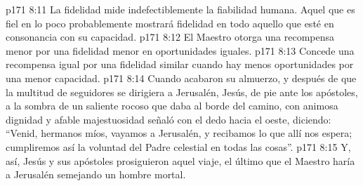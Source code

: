 \vs p171 8:11 La fidelidad mide indefectiblemente la fiabilidad humana. Aquel que es fiel en lo poco probablemente mostrará fidelidad en todo aquello que esté en consonancia con su capacidad.
\vs p171 8:12 El Maestro otorga una recompensa menor por una fidelidad menor en oportunidades iguales.
\vs p171 8:13 Concede una recompensa igual por una fidelidad similar cuando hay menos oportunidades por una menor capacidad.
\vs p171 8:14 \pc Cuando acabaron su almuerzo, y después de que la multitud de seguidores se dirigiera a Jerusalén, Jesús, de pie ante los apóstoles, a la sombra de un saliente rocoso que daba al borde del camino, con animosa dignidad y afable majestuosidad señaló con el dedo hacia el oeste, diciendo: “Venid, hermanos míos, vayamos a Jerusalén, y recibamos lo que allí nos espera; cumpliremos así la voluntad del Padre celestial en todas las cosas”.
\vs p171 8:15 Y, así, Jesús y sus apóstoles prosiguieron aquel viaje, el último que el Maestro haría a Jerusalén semejando un hombre mortal.
